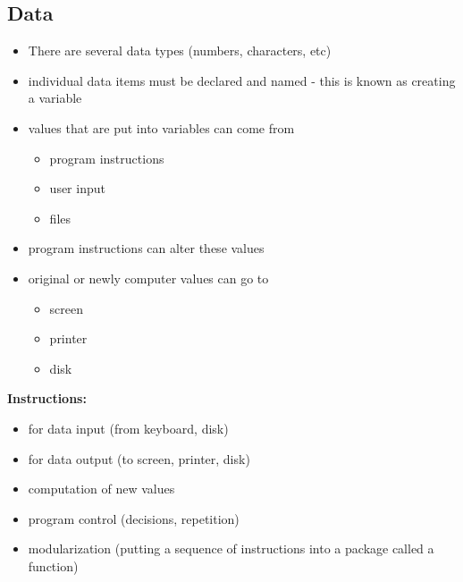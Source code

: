 \documentclass{report}
\begin{document}
    \subsection{Data}
    \begin{itemize}
        \item There are several data types (numbers, characters, etc)
        \item individual data items must be declared and named - this is known as creating a variable
        \item values that are put into variables can come from
            \begin{itemize}
                \item program instructions 
                \item user input
                \item files
            \end{itemize}
        \item program instructions can alter these values
        \item original or newly computer values can go to
            \begin{itemize}
                \item screen
                \item printer
                \item disk
            \end{itemize}
    \end{itemize}
    \bigbreak \noindent 
    \textbf{Instructions:}
    \begin{itemize}
        \item for data input (from keyboard, disk)
        \item for data output (to screen, printer, disk)
        \item computation of new values
        \item program control (decisions, repetition)
        \item modularization (putting a sequence of instructions into a package called a function)
    \end{itemize}

    \bigbreak \noindent \bigbreak \noindent 
\end{document}
